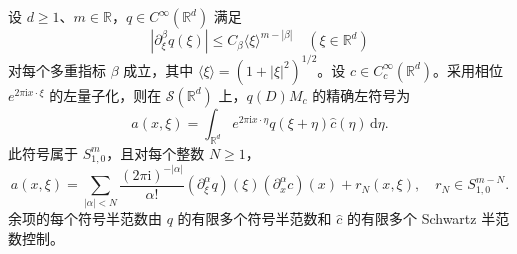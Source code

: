 \begin{proposition}[乘子与光滑乘法的有限合成]
\label{b2:prop:G-multiplier-composition}
设 \(d\ge1\)、\(m\in\mathbb R\)，\(q\in C^\infty(\mathbb R^d)\) 满足
\[
 |\partial_\xi^\beta q(\xi)|
 \le C_\beta\langle\xi\rangle^{m-|\beta|}
 \quad(\xi\in\mathbb R^d)
\]
对每个多重指标 \(\beta\) 成立，其中 \(\langle\xi\rangle=(1+|\xi|^2)^{1/2}\)。设 \(c\in C_c^\infty(\mathbb R^d)\)。采用相位 \(e^{2\pi\mathrm ix\cdot\xi}\) 的左量子化，则在 \(\mathcal S(\mathbb R^d)\) 上，\(q(D)M_c\) 的精确左符号为
\[
 a(x,\xi)=\int_{\mathbb R^d}e^{2\pi\mathrm ix\cdot\eta}
                 q(\xi+\eta)\widehat c(\eta)\,\mathrm d\eta.
\]
此符号属于 \(S^m_{1,0}\)，且对每个整数 \(N\ge1\)，
\begin{equation}\label{b2:eq:G-finite-composition}
 a(x,\xi)=\sum_{|\alpha|<N}
 \frac{(2\pi\mathrm i)^{-|\alpha|}}{\alpha!}
       (\partial_\xi^\alpha q)(\xi)(\partial_x^\alpha c)(x)
       +r_N(x,\xi),
 \quad r_N\in S^{m-N}_{1,0}.
\end{equation}
余项的每个符号半范数由 \(q\) 的有限多个符号半范数和 \(\widehat c\) 的有限多个 Schwartz 半范数控制。
\end{proposition}
